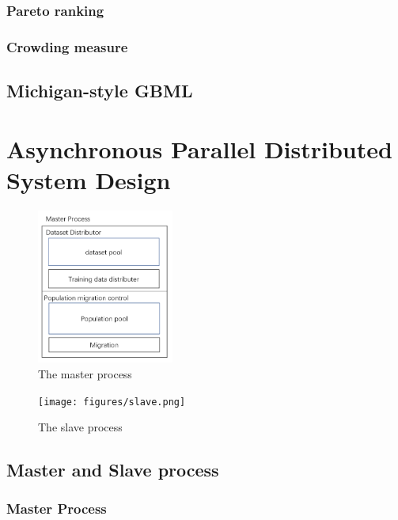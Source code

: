 \documentclass[conference]{IEEEtran}
\begin{document}
	 \subsubsection{Pareto ranking}
	 
	 \subsubsection{Crowding measure}
	 
	 \subsection{Michigan-style GBML}
	 
  
   
  \section{Asynchronous Parallel Distributed System Design}
  
  \begin{figure}[H]
    \centering
    \includegraphics[width = 0.4\textwidth]{figures/master.png}
    \caption{The master process}
    \label{fig:master}
  \end{figure}

  \begin{figure}[H]
    \centering
    \texttt{[image: figures/slave.png]}
    \caption{The slave process}
    \label{fig:slave}
  \end{figure}
  
  \subsection{Master and Slave process}
  \subsubsection{Master Process}
  
\end{document}
